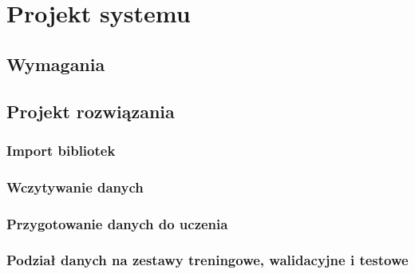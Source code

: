 \chapter{Projekt systemu}
\section{Wymagania}
\section{Projekt rozwiązania}
\subsection{Import bibliotek}
\subsection{Wczytywanie danych}
\subsection{Przygotowanie danych do uczenia}
\subsection{Podział danych na zestawy treningowe, walidacyjne i testowe}